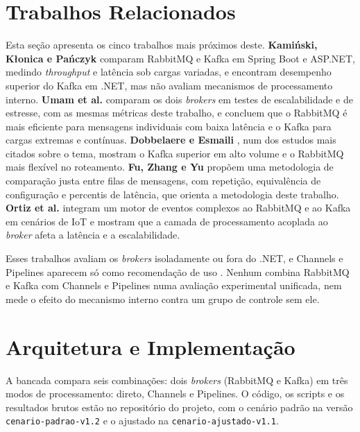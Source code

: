 \documentclass[12pt]{article}
\begin{document}

\section{Trabalhos Relacionados}
\label{sec:relacionados}

Esta seção apresenta os cinco trabalhos mais próximos deste.
\textbf{Kamiński, Kłonica e Pańczyk} \cite{kaminski:2025} comparam RabbitMQ e Kafka em
Spring Boot e ASP.NET, medindo \textit{throughput} e latência sob cargas variadas, e encontram
desempenho superior do Kafka em .NET, mas não avaliam mecanismos de processamento
interno. \textbf{Umam et al.} \cite{umam:2026} comparam os dois \textit{brokers} em testes de
escalabilidade e de estresse, com as mesmas métricas deste trabalho, e concluem que o
RabbitMQ é mais eficiente para mensagens individuais com baixa latência e o Kafka para
cargas extremas e contínuas. \textbf{Dobbelaere e Esmaili} \cite{dobbelaere:2017}, num
dos estudos mais citados sobre o tema, mostram o Kafka superior em alto volume e o
RabbitMQ mais flexível no roteamento. \textbf{Fu, Zhang e Yu} \cite{fu:2021} propõem uma
metodologia de comparação justa entre filas de mensagens, com repetição, equivalência de
configuração e percentis de latência, que orienta a metodologia deste trabalho.
\textbf{Ortiz et al.} \cite{ortiz:2023} integram um motor de eventos complexos ao
RabbitMQ e ao Kafka em cenários de IoT e mostram que a camada de processamento acoplada ao
\textit{broker} afeta a latência e a escalabilidade.

Esses trabalhos avaliam os \textit{brokers} isoladamente ou fora do .NET, e Channels e Pipelines
aparecem só como recomendação de uso \cite{cleary:2019}. Nenhum combina RabbitMQ e Kafka
com Channels e Pipelines numa avaliação experimental unificada, nem mede o efeito do
mecanismo interno contra um grupo de controle sem ele.


\section{Arquitetura e Implementação}
\label{sec:implementacao}

A bancada compara seis combinações: dois \textit{brokers} (RabbitMQ e Kafka) em três modos de
processamento: direto, Channels e Pipelines. O código, os scripts e os resultados brutos
estão no repositório do projeto, com o cenário padrão na versão
\texttt{cenario-padrao-v1.2} e o ajustado na \texttt{cenario-ajustado-v1.1}.
\end{document}
